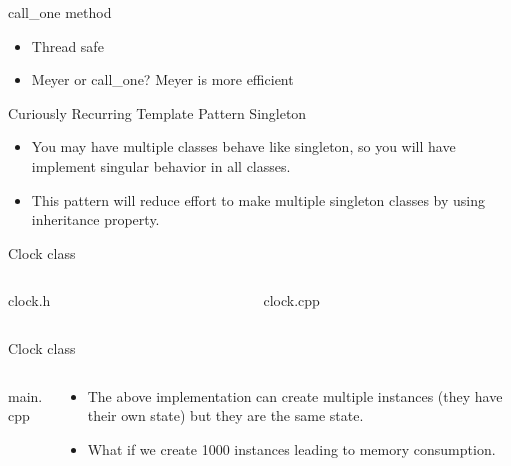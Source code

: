\documentclass[13pt]{beamer}
\begin{document}
\begin{frame}{call\_one method}
\begin{itemize}
	\setlength\itemsep{1em}
	\item Thread safe
	\item Meyer or call\_one? Meyer is more efficient
\end{itemize}
\end{frame}

\begin{frame}{Curiously Recurring Template Pattern Singleton}
\begin{itemize}
	\setlength\itemsep{1em}
	\item You may have multiple classes behave like singleton, so you will have implement singular behavior in all classes.
	\item This pattern will reduce effort to make multiple singleton classes by using inheritance property.
\end{itemize}
\end{frame}

\begin{frame}{Clock class}
\begin{columns}[T]
	\begin{column}{.45\textwidth}
		clock.h
		\lstset{basicstyle=\tiny,style=myCustomCppStyle}
		
	\end{column}
	
	\begin{column}{.45\textwidth}
		clock.cpp
		\lstset{basicstyle=\tiny,style=myCustomCppStyle}
		
	\end{column}
\end{columns}
\end{frame}

\begin{frame}{Clock class}
\begin{columns}[T]
	\begin{column}{.45\textwidth}
		main.cpp
		\lstset{basicstyle=\tiny,style=myCustomCppStyle}
		
	\end{column}
	
	\begin{column}{.45\textwidth}
		\begin{itemize}
			\setlength\itemsep{1em}
			\item The above implementation can create multiple instances (they have their own state) but they are the same state.
			\item What if we create 1000 instances leading to memory consumption.
		\end{itemize}
	\end{column}
\end{columns}
\end{frame}
\end{document}
